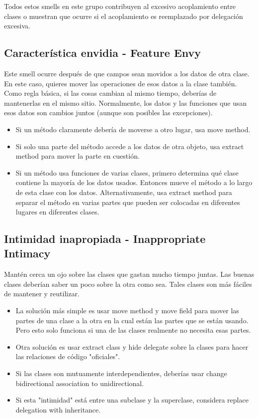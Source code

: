\documentclass[11pt,a4paper,oneside]{book}
\begin{document}
Todos estos smells en este grupo contribuyen al excesivo acoplamiento entre clases o muestran que ocurre si el acoplamiento es reemplazado por delegación excesiva. 

\subsection{Característica envidia - Feature Envy}
\label{featureenvy}
Este smell ocurre después de que campos sean movidos a los datos de otra clase. En este caso, quieres mover las operaciones de esos datos a la clase también.
\newline
Como regla básica, si las cosas cambian al mismo tiempo, deberías de mantenerlas en el mismo sitio. Normalmente, los datos y las funciones que usan esos datos son cambios juntos (aunque son posibles las excepciones).
\begin{itemize}
    \item Si un método claramente debería de moverse a otro lugar, usa move method.
    \item Si solo una parte del método accede a los datos de otra objeto, usa extract method para mover la parte en cuestión.
    \item Si un método usa funciones de varias clases, primero determina qué clase contiene la mayoría de los datos usados. Entonces mueve el método a lo largo de esta clase con los datos. Alternativamente, usa extract method para separar el método en varias partes que pueden ser colocadas en diferentes lugares en diferentes clases.
\end{itemize}

\subsection{Intimidad inapropiada - Inappropriate Intimacy}
\label{inappropriateintimacy}
Mantén cerca un ojo sobre las clases que gastan mucho tiempo juntas. Las buenas clases deberían saber un poco sobre la otra como sea. Tales clases son más fáciles de mantener y reutilizar.
\newline
\begin{itemize}
    \item La solución más simple es usar move method y move field para mover las partes de una clase a la otra en la cual están las partes que se están usando. Pero esto solo funciona si una de las clases realmente no necesita esas partes.
    \item Otra solución es usar extract class y hide delegate sobre la clases para hacer las relaciones de código "oficiales".
    \item Si las clases son mutuamente interdependientes, deberías usar change bidirectional association to unidirectional.
    \item Si esta "intimidad" está entre una subclase y la superclase, considera replace delegation with inheritance.
\end{itemize}
    
\end{document}
